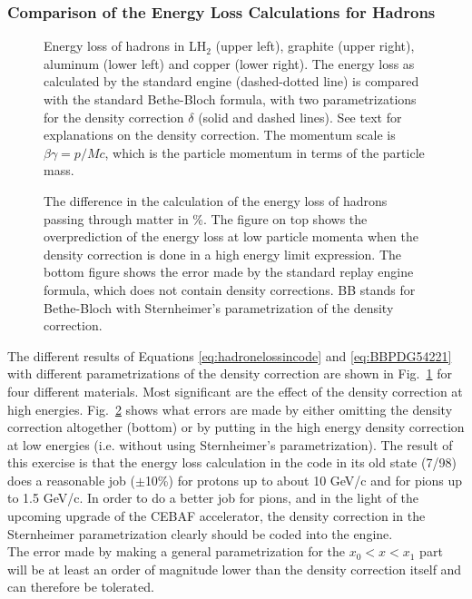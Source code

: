 \subsubsection{Comparison of the Energy Loss Calculations for Hadrons}
\hspace*{\parindent}

\begin{figure}
\hspace{0.0in}
\epsfxsize=5.0in
\epsfysize=6.0in
\caption{Energy loss of hadrons in LH$_2$ (upper left), graphite (upper right), aluminum 
(lower left) and copper (lower right). The energy loss as calculated by the standard
engine (dashed-dotted line) is compared with the standard Bethe-Bloch formula, with two
parametrizations for the density correction $\delta$ (solid and dashed lines). See text 
for explanations on the density correction. The momentum scale is $\beta \gamma=p/Mc$, 
which is the particle momentum in terms of the particle mass.}
\label{fig:hadronloss}
\end{figure}

\begin{figure}
\hspace{0.0in}
\epsfxsize=5.0in
\epsfysize=6.0in
\caption{The difference in the calculation of the energy loss of hadrons passing through
matter in \%. The figure on top shows the overprediction of the energy loss at low 
particle momenta when the density correction is done in a high energy limit expression. 
The bottom figure shows the error made by the standard replay engine formula, which does
not contain density corrections. BB stands for Bethe-Bloch with Sternheimer's 
parametrization of the density correction.}
\label{fig:hadronlossrel}
\end{figure}

The different results of Equations \ref{eq:hadronelossincode} and \ref{eq:BBPDG54221} 
with different parametrizations of the density correction are shown in 
Fig.~\ref{fig:hadronloss} for four different materials. Most significant are the effect 
of the density correction at high energies. Fig.~\ref{fig:hadronlossrel} shows what errors
are made by either omitting the density correction altogether (bottom) or by putting in
the high energy density correction at low energies (i.e. without using Sternheimer's 
parametrization). The result of this exercise is that the energy loss calculation in
the code in its old state (7/98) does a reasonable job ($\pm$10\%) for protons up to 
about 10 GeV/c and for pions up to 1.5 GeV/c. In order to do a better job for pions, and
in the light of the upcoming upgrade of the CEBAF accelerator, the density correction in
the Sternheimer parametrization clearly should be coded into the engine.\\
The error made by making a general parametrization for the $x_0<x<x_1$ part will be at
least an order of magnitude lower than the density correction itself and can therefore
be tolerated.

